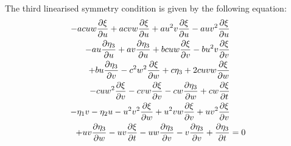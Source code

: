 The third linearised symmetry condition is given by the following equation:
\begin{align}
  - a c u w \pdv{\xi}{u} + a c v w \pdv{\xi}{u} + a u^{2} v \pdv{\xi}{u} - a u v^{2} \pdv{\xi}{u}&\nonumber\\
  - a u \pdv{\eta_3}{u} + a v \pdv{\eta_3}{u} + b c u w \pdv{\xi}{v} - b u^{2} v \pdv{\xi}{v}&\nonumber\\
  + b u \pdv{\eta_3}{v} - c^{2} w^{2} \pdv{\xi}{w} + c \eta_3 + 2 c u v w \pdv{\xi}{w}&\nonumber\\
  - c u w^{2} \pdv{\xi}{v} - c v w \pdv{\xi}{v} - c w \pdv{\eta_3}{w} + c w \pdv{\xi}{t}&\nonumber\\
  - \eta_1 v - \eta_2 u - u^{2} v^{2} \pdv{\xi}{w} + u^{2} v w \pdv{\xi}{v} + u v^{2} \pdv{\xi}{v}&\nonumber\\
  + u v \pdv{\eta_3}{w} - u v \pdv{\xi}{t} - u w \pdv{\eta_3}{v} - v \pdv{\eta_3}{v} + \pdv{\eta_3}{t}&=0\label{eq:Lorenz_lin_sym_3}
\end{align}
